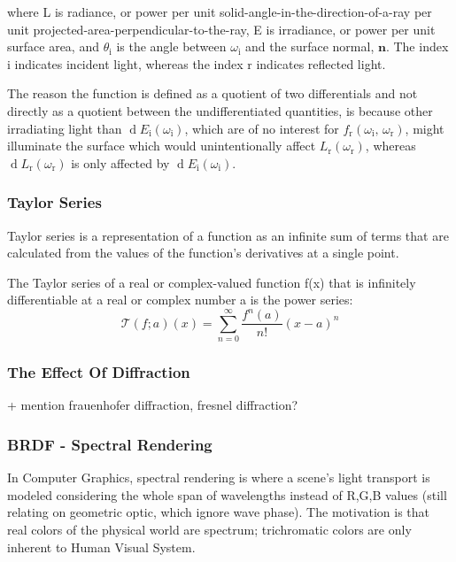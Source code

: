 where L is radiance, or power per unit solid-angle-in-the-direction-of-a-ray per unit projected-area-perpendicular-to-the-ray, E is irradiance, or power per unit surface area, and $\theta_{\text{i}}$ is the angle between $\omega_{\text{i}}$ and the surface normal, $\mathbf n$. The index $\text{i}$ indicates incident light, whereas the index $\text{r}$ indicates reflected light.

The reason the function is defined as a quotient of two differentials and not directly as a quotient between the undifferentiated quantities, is because other irradiating light than $\operatorname dE_{\text{i}}(\omega_{\text{i}})$, which are of no interest for $f_{\text{r}}(\omega_{\text{i}},\, \omega_{\text{r}})$, might illuminate the surface which would unintentionally affect $L_{\text{r}}(\omega_{\text{r}})$, whereas $\operatorname dL_{\text{r}}(\omega_{\text{r}})$ is only affected by $\operatorname dE_{\text{i}}(\omega_{\text{i}})$.

\subsubsection{Taylor Series}
Taylor series is a representation of a function as an infinite sum of terms that are calculated from the values of the function's derivatives at a single point.

The Taylor series of a real or complex-valued function ƒ(x) that is infinitely differentiable at a real or complex number a is the power series:
\begin{equation}
  \mathcal T(f;a)(x) = \sum_{n=0}^{\infty} \frac{f^{n}(a)}{n!}(x-a)^n
\end{equation}


\subsubsection{The Effect Of Diffraction}
+ mention frauenhofer diffraction, fresnel diffraction?
\subsubsection{BRDF - Spectral Rendering}
In Computer Graphics, spectral rendering is where a scene's light transport is modeled considering the whole span of wavelengths instead of R,G,B values (still relating on geometric optic, which ignore wave phase). The motivation is that real colors of the physical world are spectrum; trichromatic colors are only inherent to Human Visual System.

